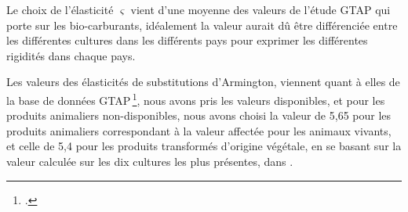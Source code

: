 Le choix de l'élasticité $\varsigma$ vient d'une moyenne des valeurs de l'étude GTAP \cite{Miller2009} qui porte sur les bio-carburants, idéalement la valeur aurait dû être différenciée entre les différentes cultures dans les différents pays pour exprimer les différentes rigidités dans chaque pays.

Les valeurs des élasticités de substitutions d'Armington, viennent quant à elles de la base de données GTAP\,\footcite{Aguiar2022}, nous avons pris les valeurs disponibles, et pour les produits animaliers non-disponibles, nous avons choisi la valeur de 5,65 pour les produits animaliers correspondant à la valeur affectée pour les animaux vivants, et celle de 5,4 pour les produits transformés d'origine végétale, en se basant sur la valeur calculée sur les dix cultures les plus présentes, dans \cite{Costinot2016}.
